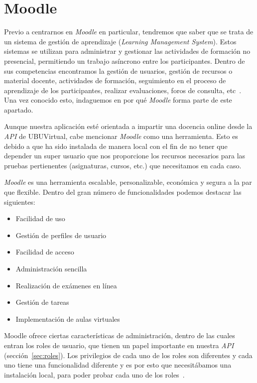 
\section{Moodle}\label{sec:moodle-local}
Previo a centrarnos en \textit{Moodle} en particular, tendremos que saber que se trata de un sistema de gestión de aprendizaje (\textit{Learning Management System}). Estos sistemas se utilizan para administrar y gestionar las actividades de formación no presencial, permitiendo un trabajo asíncrono entre los participantes. Dentro de sus competencias encontramos la gestión de usuarios, gestión de recursos o material docente, actividades de formación, seguimiento en el proceso de aprendizaje de los participantes, realizar evaluaciones, foros de consulta, etc~\cite{wiki:sistemaGestionAprendizaje}. Una vez conocido esto, indaguemos en por qué \textit{Moodle} forma parte de este apartado.

Aunque nuestra aplicación esté orientada a impartir una docencia online desde la \textit{API} de UBUVirtual, cabe mencionar \textit{Moodle} como una herramienta. Esto es debido a que ha sido instalada de manera local con el fin de no tener que depender un super usuario que nos proporcione los recursos necesarios para las pruebas pertienentes (asignaturas, cursos, etc.) que necesitamos en cada caso.

\textit{Moodle} es una herramienta escalable, personalizable, económica y segura a la par que flexible. Dentro del gran número de funcionalidades podemos destacar las siguientes:

\begin{itemize}
	\item Facilidad de uso
	\item Gestión de perfiles de usuario
	\item Facilidad de acceso
	\item Administración sencilla
	\item Realización de exámenes en línea
	\item Gestión de tareas
	\item Implementación de aulas virtuales
\end{itemize}

Moodle ofrece ciertas características de administración, dentro de las cuales entran los roles de usuario, que tienen un papel importante en nuestra \textit{API} (sección~\ref{sec:roles}). Los privilegios de cada uno de los roles son diferentes y cada uno tiene una funcionalidad diferente y es por esto que necesitábamos una instalación local, para poder probar cada uno de los roles~\cite{wiki:moodle}.

